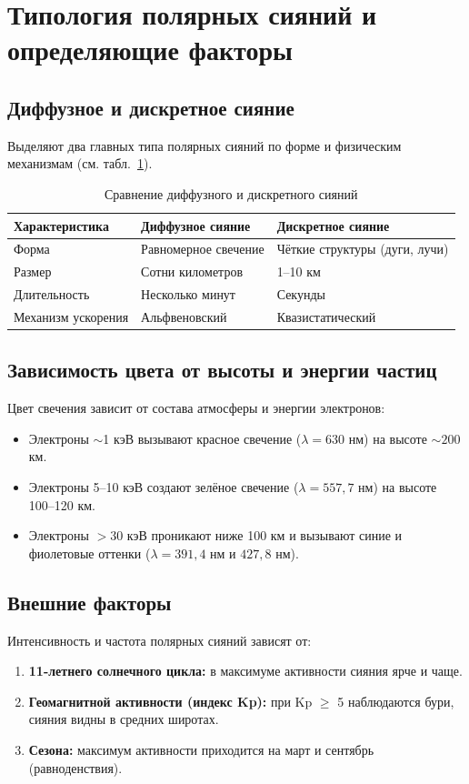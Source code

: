\section{Типология полярных сияний и определяющие факторы}

\subsection{Диффузное и дискретное сияние}

Выделяют два главных типа полярных сияний по форме и физическим механизмам (см. табл.~\ref{tab:types}).

\begin{table}[H]
    \centering
    \caption{Сравнение диффузного и дискретного сияний}
    \label{tab:types}
    \begin{tabular}{|p{4cm}|p{5cm}|p{5cm}|}
        \hline
        \textbf{Характеристика} & \textbf{Диффузное сияние} & \textbf{Дискретное сияние} \\
        \hline
        Форма & Равномерное свечение & Чёткие структуры (дуги, лучи) \\
        \hline
        Размер & Сотни километров & 1--10 км \\
        \hline
        Длительность & Несколько минут & Секунды \\
        \hline
        Механизм ускорения & Альфвеновский & Квазистатический \\
        \hline
    \end{tabular}
\end{table}

\subsection{Зависимость цвета от высоты и энергии частиц}

Цвет свечения зависит от состава атмосферы и энергии электронов:
\begin{itemize}
    \item Электроны $\sim$1 кэВ вызывают красное свечение ($\lambda = 630$ нм) на высоте $\sim200$ км.
    \item Электроны 5--10 кэВ создают зелёное свечение ($\lambda = 557,7$ нм) на высоте 100--120 км.
    \item Электроны $>$30 кэВ проникают ниже 100 км и вызывают синие и фиолетовые оттенки ($\lambda = 391,4$ нм и $427,8$ нм).
\end{itemize}

\subsection{Внешние факторы}

Интенсивность и частота полярных сияний зависят от:
\begin{enumerate}
    \item \textbf{11-летнего солнечного цикла:} в максимуме активности сияния ярче и чаще.
    \item \textbf{Геомагнитной активности (индекс Kp):} при Kp $\ge$ 5 наблюдаются бури, сияния видны в средних широтах.
    \item \textbf{Сезона:} максимум активности приходится на март и сентябрь (равноденствия).
\end{enumerate}